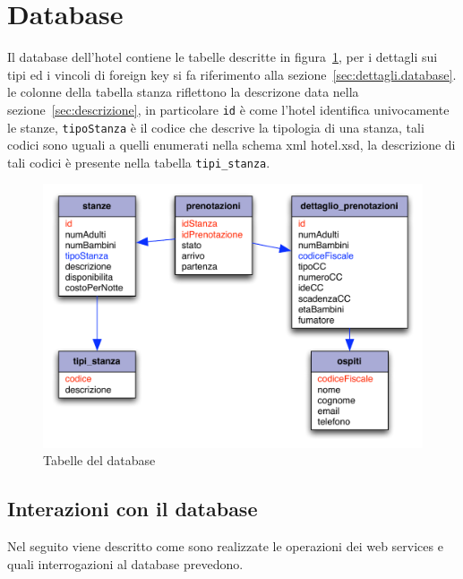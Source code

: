 \documentclass[a4paper]{article}
\begin{document}

\section{Database}
\label{sec:database}
\lstset{basicstyle=\small, tabsize=2, language=SQL, breaklines=true,
  captionpos=b, frame=simple}

Il database dell'hotel contiene le tabelle descritte in
figura~\ref{fig:database}, per i dettagli sui tipi ed i vincoli di
foreign key si fa riferimento alla
sezione~\ref{sec:dettagli.database}. le colonne della tabella stanza
riflettono la descrizone data nella sezione~\ref{sec:descrizione}, in
particolare \verb'id' \`e come l'hotel identifica univocamente le
stanze, \verb'tipoStanza' \`e il codice che descrive la tipologia di
una stanza, tali codici sono uguali a quelli enumerati nella schema
xml hotel.xsd, la descrizione di tali codici \`e presente nella
tabella \verb'tipi_stanza'. 

\begin{figure}[h]
  \includegraphics[scale=0.7]{tabelle.pdf}
  \caption{Tabelle del database}
  \label{fig:database}
\end{figure}

\subsection{Interazioni con il database}
\label{sec:database.interazioni}
Nel seguito viene descritto come sono realizzate le operazioni dei web
services e quali interrogazioni al database prevedono.
\end{document}
